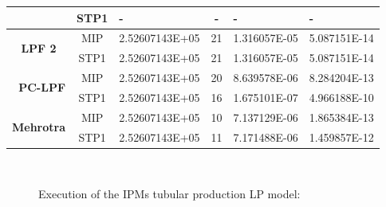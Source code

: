 \documentclass[a4paper,10 pt,titlepage,twoside]{report}
\theoremstyle{plain}
\theoremstyle{definition}
\theoremstyle{remark}
\begin{document}
{{\begin{table}[]
\begin{tabular}{cclcll}
		\multicolumn{1}{c|}{} & STP1 & - & - & - & - \\ \hline
		\multicolumn{1}{c|}{\multirow{2}{*}{\textbf{LPF 2}}} & MIP & 2.52607143E+05 & 21 & 1.316057E-05 & 5.087151E-14 \\
		\multicolumn{1}{c|}{} & STP1 & 2.52607143E+05 & 21 & 1.316057E-05 & 5.087151E-14 \\ \hline
		\multicolumn{1}{r|}{\multirow{2}{*}{\textbf{PC-LPF}}} & MIP & 2.52607143E+05 & 20 & 8.639578E-06 & 8.284204E-13 \\
		\multicolumn{1}{r|}{} & STP1 & 2.52607143E+05 & 16 & 1.675101E-07 & 4.966188E-10 \\ \hline
		\multicolumn{1}{c|}{\multirow{2}{*}{\textbf{Mehrotra}}} & MIP & 2.52607143E+05 & 10 & 7.137129E-06 & 1.865384E-13 \\
		\multicolumn{1}{c|}{} & STP1 & 2.52607143E+05 & 11 & 7.171488E-06 & 1.459857E-12 \\ \hline
	\end{tabular}
\end{table}
\begin{figure}\caption{\label{figure:tub}Execution of the IPMs tubular production LP model:}
	 \qquad%
	\\
	 \qquad%

\end{figure}}}
\end{document}

